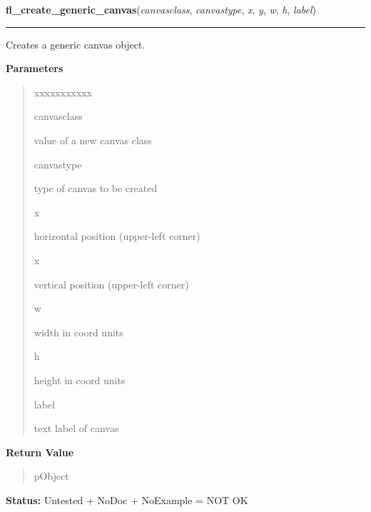 \hspace{.8\funcindent}\begin{boxedminipage}{\funcwidth}

    \raggedright \textbf{fl\_create\_generic\_canvas}(\textit{canvasclass}, \textit{canvastype}, \textit{x}, \textit{y}, \textit{w}, \textit{h}, \textit{label})

    \vspace{-1.5ex}

    \rule{\textwidth}{0.5\fboxrule}
\setlength{\parskip}{2ex}
    Creates a generic canvas object.

\setlength{\parskip}{1ex}
      \textbf{Parameters}
      \vspace{-1ex}

      \begin{quote}
        \begin{Ventry}{xxxxxxxxxxx}

          \item[canvasclass]

          value of a new canvas class

          \item[canvastype]

          type of canvas to be created

          \item[x]

          horizontal position (upper-left corner)

          \item[x]

          vertical position (upper-left corner)

          \item[w]

          width in coord units

          \item[h]

          height in coord units

          \item[label]

          text label of canvas

        \end{Ventry}

      \end{quote}

      \textbf{Return Value}
    \vspace{-1ex}

      \begin{quote}
      pObject

      \end{quote}

\textbf{Status:} Untested + NoDoc + NoExample = NOT OK



    \end{boxedminipage}

